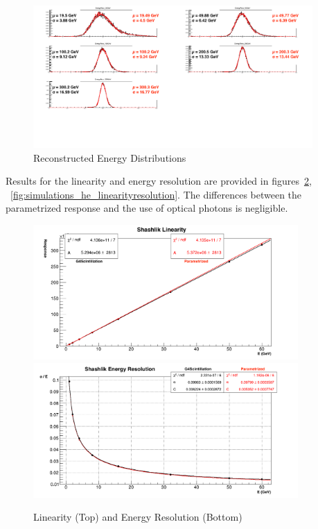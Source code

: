   \begin{figure}[hbp]
    \centering
    \includegraphics[width=0.95\textwidth]{figures/ch_simulations/he/performance/EnergyRECODistributions.png}
    \caption{Reconstructed Energy Distributions}
    \label{fig:simulations_he_energyreco}
 \end{figure}

 Results for the linearity and energy resolution are provided in figures~\ref{fig:simulations_shashlik_linearityresolution}, ~\ref{fig:simulations_he_linearityresolution}. The differences between the parametrized response and the use of optical photons is negligible.

 \begin{figure}[hbp]
    \centering
    \includegraphics[width=0.9\textwidth]{figures/ch_simulations/shashlik/performance/ResponseVsEnergy.png}
    \includegraphics[width=0.9\textwidth]{figures/ch_simulations/shashlik/performance/energyResolution.png}
    \caption{Linearity (Top) and Energy Resolution (Bottom)}
    \label{fig:simulations_shashlik_linearityresolution}
 \end{figure}


